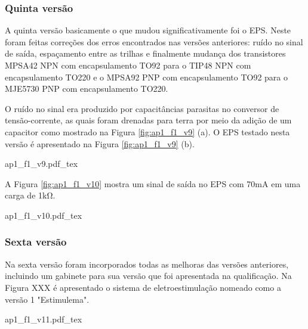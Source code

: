 \subsubsection*{Quinta versão}
A quinta versão basicamente o que mudou significativamente foi o \acrshort{EPS}. Neste foram feitas correções dos erros encontrados nas versões anteriores: ruído no sinal de saída, espaçamento entre as trilhas e finalmente mudança dos transistores MPSA42 NPN com encapsulamento TO92 para o TIP48 NPN com encapsulamento TO220 e o MPSA92 PNP com encapsulamento TO92 para o MJE5730 PNP com encapsulamento TO220.

O ruído no sinal era produzido por capacitâncias parasitas no conversor de tensão-corrente, as quais foram drenadas para terra por meio da adição de um capacitor como mostrado na Figura \ref{fig:ap1_f1_v9} (a). O \acrshort{EPS} testado nesta versão é apresentado na Figura \ref{fig:ap1_f1_v9} (b).

\begin{figure*}[h]
    \centering %
    \small %
    \def\svgwidth{1\columnwidth}%
    {ap1_f1_v9.pdf_tex}
    \caption{Diagrama e PCI do EPS da quinta versão do sistema.}
    \label{fig:ap1_f1_v9}
\end{figure*}

A Figura \ref{fig:ap1_f1_v10} mostra um sinal de saída no EPS com 70mA em uma carga de 1k$\mathrm{\Omega}$.

\begin{figure*}[h]
    \centering %
    \small %
    \def\svgwidth{0.7\columnwidth}%
    {ap1_f1_v10.pdf_tex}
    \caption{Diagrama e PCI do EPS da quinta versão do sistema.}
    \label{fig:ap1_f1_v10}
\end{figure*}

\subsubsection*{Sexta versão}
Na sexta versão foram incorporados todas as melhoras das versões anteriores, incluindo um gabinete para sua versão que foi apresentada na qualificação. Na Figura XXX é apresentado o sistema de eletroestimulação nomeado como a versão 1 "Estimulema".

\begin{figure*}[h]
    \centering %
    \small %
    \def\svgwidth{1\columnwidth}%
    {ap1_f1_v11.pdf_tex}
    \caption{Diagrama e PCI do EPS da quinta versão do sistema.}
    \label{fig:ap1_f1_v11}
\end{figure*}
